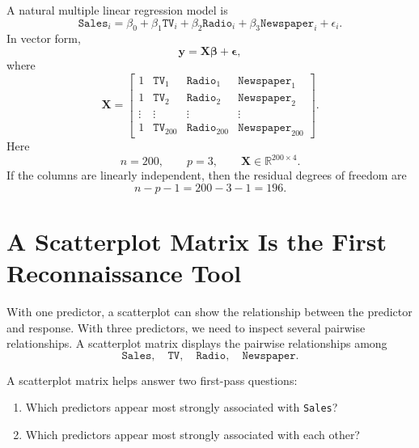 A natural multiple linear regression model is
\begin{equation}
  \texttt{Sales}_i
  =\beta_0
  +\beta_1\texttt{TV}_i
  +\beta_2\texttt{Radio}_i
  +\beta_3\texttt{Newspaper}_i
  +\epsilon_i.
\end{equation}
In vector form,
\begin{equation}
  \mathbf{y}=\mathbf{X}\boldsymbol{\beta}+\boldsymbol{\epsilon},
\end{equation}
where
\begin{equation}
  \mathbf{X}=\begin{bmatrix}
    1 & \texttt{TV}_1 & \texttt{Radio}_1 & \texttt{Newspaper}_1\\
    1 & \texttt{TV}_2 & \texttt{Radio}_2 & \texttt{Newspaper}_2\\
    \vdots & \vdots & \vdots & \vdots\\
    1 & \texttt{TV}_{200} & \texttt{Radio}_{200} & \texttt{Newspaper}_{200}
  \end{bmatrix}.
\end{equation}
Here
\begin{equation}
  n=200,\qquad p=3,\qquad \mathbf{X}\in\mathbb{R}^{200\times 4}.
\end{equation}
If the columns are linearly independent, then the residual degrees of freedom are
\begin{equation}
  n-p-1=200-3-1=196.
\end{equation}

\section{A Scatterplot Matrix Is the First Reconnaissance Tool}

With one predictor, a scatterplot can show the relationship between the predictor and response.  With three predictors, we need to inspect several pairwise relationships.  A scatterplot matrix displays the pairwise relationships among
\begin{equation}
  \texttt{Sales},\quad \texttt{TV},\quad \texttt{Radio},\quad \texttt{Newspaper}.
\end{equation}

A scatterplot matrix helps answer two first-pass questions:
\begin{enumerate}
  \item Which predictors appear most strongly associated with \texttt{Sales}?
  \item Which predictors appear most strongly associated with each other?
\end{enumerate}


